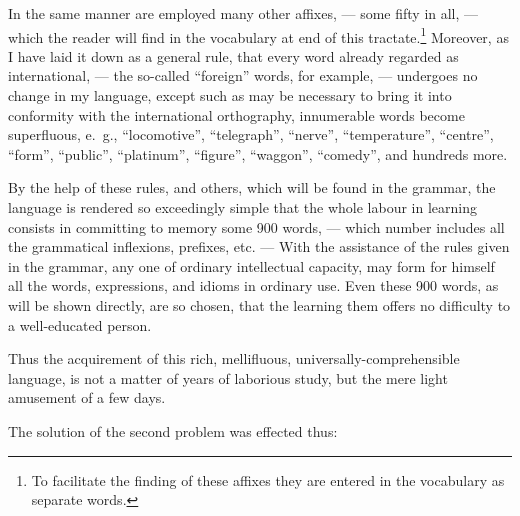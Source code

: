 \documentclass[12pt,twoside]{book}
\begin{document}
In the same manner are employed many other affixes, --- some fifty in all, --- which the reader will find in the vocabulary at end of this tractate.\footnote{To facilitate the finding of these affixes they are entered in the vocabulary as separate words.} Moreover, as I have laid it down as a general rule, that every word already regarded as international, --- the so-called “foreign” words, for example, --- undergoes no change in my language, except such as may be necessary to bring it into conformity with the international orthography, innumerable words become superfluous, e.~g., “locomotive”, “telegraph”, “nerve”, “temperature”, “centre”, “form”, “public”, “platinum”, “figure”, “waggon”, “comedy”, and hundreds more.

By the help of these rules, and others, which will be found in the grammar, the language is rendered so exceedingly simple that the whole labour in learning consists in committing to memory some 900 words, --- which number includes all the grammatical inflexions, prefixes, etc. --- With the assistance of the rules given in the grammar, any one of ordinary intellectual capacity, may form for himself all the words, expressions, and idioms in ordinary use. Even these 900 words, as will be shown directly, are so chosen, that the learning them offers no difficulty to a well-educated person.

Thus the acquirement of this rich, mellifluous, universally-comprehensible language, is not a matter of years of laborious study, but the mere light amusement of a few days. 


The solution of the second problem was effected thus:
\end{document}
